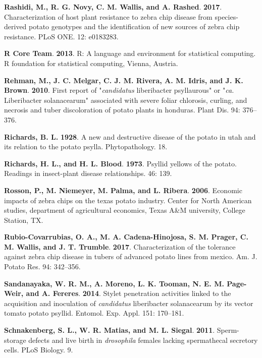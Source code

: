 \documentclass[]{article}
\begin{document}
\leavevmode\hypertarget{ref-Rashidi2017}{}%
\textbf{Rashidi, M., R. G. Novy, C. M. Wallis, and A. Rashed}.
\textbf{2017}. Characterization of host plant resistance to zebra chip
disease from species-derived potato genotypes and the identification of
new sources of zebra chip resistance. PLoS ONE. 12: e0183283.

\leavevmode\hypertarget{ref-RCT2013}{}%
\textbf{R Core Team}. \textbf{2013}. R: A language and environment for
statistical computing. R foundation for statistical computing, Vienna,
Austria.

\leavevmode\hypertarget{ref-Rehman2010}{}%
\textbf{Rehman, M., J. C. Melgar, C. J. M. Rivera, A. M. Idris, and J.
K. Brown}. \textbf{2010}. First report of "\emph{candidatus}
liberibacter psyllaurous" or "\emph{ca.} Liberibacter solanacearum"
associated with severe foliar chlorosis, curling, and necrosis and tuber
discoloration of potato plants in honduras. Plant Dis. 94: 376--376.

\leavevmode\hypertarget{ref-Richards1928}{}%
\textbf{Richards, B. L.} \textbf{1928}. A new and destructive disease of
the potato in utah and its relation to the potato psylla.
Phytopathology. 18.

\leavevmode\hypertarget{ref-Richards1973}{}%
\textbf{Richards, H. L., and H. L. Blood}. \textbf{1973}. Psyllid
yellows of the potato. Readings in insect-plant disease relationships.
46: 139.

\leavevmode\hypertarget{ref-Rosson2006}{}%
\textbf{Rosson, P., M. Niemeyer, M. Palma, and L. Ribera}.
\textbf{2006}. Economic impacts of zebra chips on the texas potato
industry. Center for North American studies, department of agricultural
economics, Texas A\&M university, College Station, TX.

\leavevmode\hypertarget{ref-Rubio-Covarrubias2017}{}%
\textbf{Rubio-Covarrubias, O. A., M. A. Cadena-Hinojosa, S. M. Prager,
C. M. Wallis, and J. T. Trumble}. \textbf{2017}. Characterization of the
tolerance against zebra chip disease in tubers of advanced potato lines
from mexico. Am. J. Potato Res. 94: 342--356.

\leavevmode\hypertarget{ref-Sandanayaka2014}{}%
\textbf{Sandanayaka, W. R. M., A. Moreno, L. K. Tooman, N. E. M.
Page-Weir, and A. Fereres}. \textbf{2014}. Stylet penetration activities
linked to the acquisition and inoculation of \emph{candidatus}
liberibacter solanacearum by its vector tomato potato psyllid. Entomol.
Exp. Appl. 151: 170--181.

\leavevmode\hypertarget{ref-Schnakenberg2011}{}%
\textbf{Schnakenberg, S. L., W. R. Matias, and M. L. Siegal}.
\textbf{2011}. Sperm-storage defects and live birth in \emph{drosophila}
females lacking spermathecal secretory cells. PLoS Biology. 9.
\end{document}
